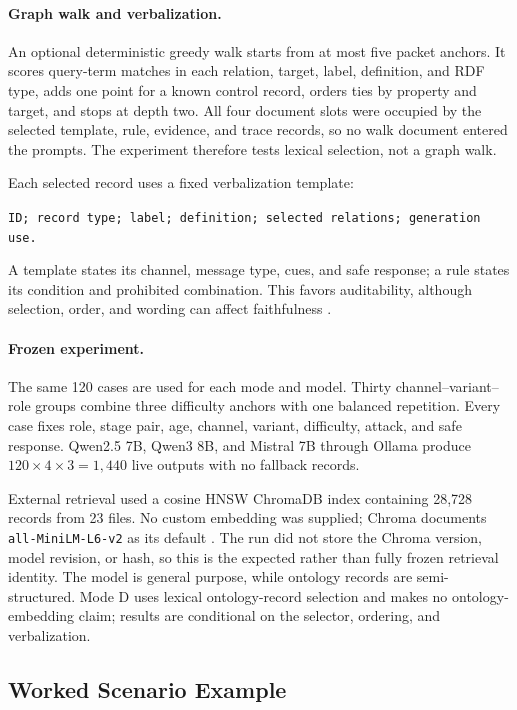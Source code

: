 \documentclass[runningheads]{llncs}
\begin{document}
\paragraph{Graph walk and verbalization.}
An optional deterministic greedy walk starts from at most five packet anchors. It
scores query-term matches in each relation, target, label, definition, and RDF
type, adds one point for a known control record, orders ties by property and
target, and stops at depth two. All four document slots were occupied by the
selected template, rule, evidence, and trace records, so no walk document entered
the prompts. The experiment therefore tests lexical selection, not a graph walk.

Each selected record uses a fixed verbalization template:
\begin{center}\small
\texttt{ID; record type; label; definition; selected relations; generation use.}
\end{center}
A template states its channel, message type, cues, and safe response; a rule states
its condition and prohibited combination. This favors auditability, although
selection, order, and wording can affect faithfulness \cite{galanis2014,hashem2023}.

\paragraph{Frozen experiment.}
The same 120 cases are used for each mode and model. Thirty channel--variant--role
groups combine three difficulty anchors with one balanced repetition. Every case
fixes role, stage pair, age, channel, variant, difficulty, attack, and safe
response. Qwen2.5 7B, Qwen3 8B, and Mistral 7B through Ollama produce
$120\times4\times3=1{,}440$ live outputs with no fallback records.

External retrieval used a cosine HNSW ChromaDB index containing 28,728 records
from 23 files. No custom embedding was supplied; Chroma documents
\texttt{all-MiniLM-L6-v2} as its default \cite{chromaDefault}. The run did not
store the Chroma version, model revision, or hash, so this is the expected rather
than fully frozen retrieval identity. The model is general purpose, while ontology
records are semi-structured. Mode D uses lexical ontology-record selection and
makes no ontology-embedding claim; results are conditional on the selector,
ordering, and verbalization.

\subsection{Worked Scenario Example}
\end{document}

